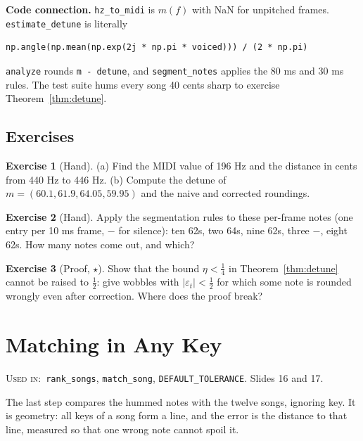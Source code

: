 \documentclass[11pt]{article}
\theoremstyle{definition}
\newtheorem{innerexercise}{Exercise}[section]
\newenvironment{exercise}[1][]{\begin{innerexercise}[#1]}{\end{innerexercise}}
\newcommand{\abs}[1]{\lvert #1\rvert}
\newcommand{\code}[1]{\texttt{#1}}
\newcommand{\usedin}[1]{\par\noindent\colorbox{black!8}{\parbox{\dimexpr\linewidth-2\fboxsep\relax}{\small\textsc{Used in:}~#1}}\par\medskip}
\begin{document}
\begin{connection}
\textbf{Code connection.} \code{hz\_to\_midi} is $m(f)$ with NaN for unpitched
frames. \code{estimate\_detune} is literally
\begin{lstlisting}
np.angle(np.mean(np.exp(2j * np.pi * voiced))) / (2 * np.pi)
\end{lstlisting}
\code{analyze}
rounds \code{m - detune}, and \code{segment\_notes} applies the 80 ms and 30 ms rules.
The test suite hums every song 40 cents sharp to exercise Theorem~\ref{thm:detune}.
\end{connection}

\subsection{Exercises}
\begin{exercise}[Hand]\label{ex:detunehand}
(a) Find the MIDI value of 196 Hz and the distance in cents from 440 Hz to 446 Hz.
(b) Compute the detune of $m=(60.1,61.9,64.05,59.95)$ and the naive and corrected
roundings.
\end{exercise}

\begin{exercise}[Hand]\label{ex:segment}
Apply the segmentation rules to these per-frame notes (one entry per 10 ms frame, $-$
for silence): ten 62s, two 64s, nine 62s, three $-$, eight 62s. How many notes come
out, and which?
\end{exercise}

\begin{exercise}[Proof, $\star$]\label{ex:eta}
Show that the bound $\eta<\frac14$ in Theorem~\ref{thm:detune} cannot be raised to
$\frac12$: give wobbles with $\abs{\varepsilon_t}<\frac12$ for which some note is
rounded wrongly even after correction. Where does the proof break?
\end{exercise}

\section{Matching in Any Key}\label{sec:match}
\usedin{\code{rank\_songs}, \code{match\_song}, \code{DEFAULT\_TOLERANCE}. Slides 16
and 17.}

The last step compares the hummed notes with the twelve songs, ignoring key. It is
geometry: all keys of a song form a line, and the error is the distance to that line,
measured so that one wrong note cannot spoil it.
\end{document}
